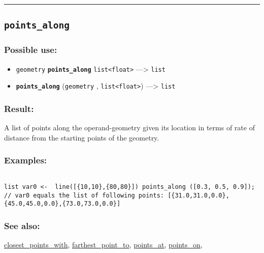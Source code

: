 \documentclass[]{book}
\providecommand{\tightlist}{%
  \setlength{\itemsep}{0pt}\setlength{\parskip}{0pt}}
\theoremstyle{definition}
\theoremstyle{definition}
\theoremstyle{definition}
\theoremstyle{remark}
\begin{document}
\begin{center}\rule{0.5\linewidth}{\linethickness}\end{center}

\subsection{\texorpdfstring{\texttt{points\_along}}{points\_along}}\label{points_along}

\subsubsection{Possible use:}\label{possible-use-409}

\begin{itemize}
\tightlist
\item
  \texttt{geometry} \textbf{\texttt{points\_along}}
  \texttt{list\textless{}float\textgreater{}} ---\textgreater{}
  \texttt{list}
\item
  \textbf{\texttt{points\_along}} (\texttt{geometry} ,
  \texttt{list\textless{}float\textgreater{}}) ---\textgreater{}
  \texttt{list}
\end{itemize}

\subsubsection{Result:}\label{result-395}

A list of points along the operand-geometry given its location in terms
of rate of distance from the starting points of the geometry.

\subsubsection{Examples:}\label{examples-283}

\begin{verbatim}
 
list var0 <-  line([{10,10},{80,80}]) points_along ([0.3, 0.5, 0.9]); // var0 equals the list of following points: [{31.0,31.0,0.0},{45.0,45.0,0.0},{73.0,73.0,0.0}]
\end{verbatim}

\subsubsection{See also:}\label{see-also-162}

\href{OperatorsBC\#closest_points_with}{closest\_points\_with},
\href{OperatorsDH\#farthest_point_to}{farthest\_point\_to},
\href{OperatorsNR\#points_at}{points\_at},
\href{OperatorsNR\#points_on}{points\_on},
\end{document}
